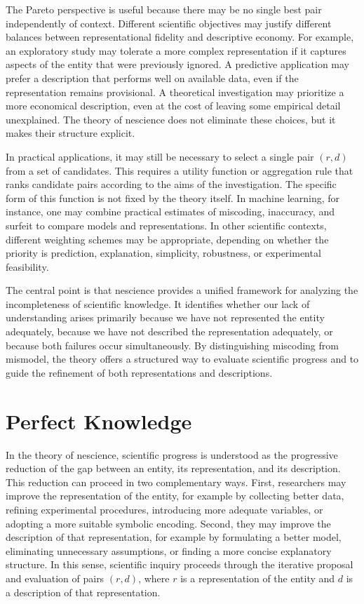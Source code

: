 The Pareto perspective is useful because there may be no single best pair independently of context. Different scientific objectives may justify different balances between representational fidelity and descriptive economy. For example, an exploratory study may tolerate a more complex representation if it captures aspects of the entity that were previously ignored. A predictive application may prefer a description that performs well on available data, even if the representation remains provisional. A theoretical investigation may prioritize a more economical description, even at the cost of leaving some empirical detail unexplained. The theory of nescience does not eliminate these choices, but it makes their structure explicit.

In practical applications, it may still be necessary to select a single pair $(r,d)$ from a set of candidates. This requires a utility function or aggregation rule that ranks candidate pairs according to the aims of the investigation. The specific form of this function is not fixed by the theory itself. In machine learning, for instance, one may combine practical estimates of miscoding, inaccuracy, and surfeit to compare models and representations. In other scientific contexts, different weighting schemes may be appropriate, depending on whether the priority is prediction, explanation, simplicity, robustness, or experimental feasibility.

The central point is that nescience provides a unified framework for analyzing the incompleteness of scientific knowledge. It identifies whether our lack of understanding arises primarily because we have not represented the entity adequately, because we have not described the representation adequately, or because both failures occur simultaneously. By distinguishing miscoding from mismodel, the theory offers a structured way to evaluate scientific progress and to guide the refinement of both representations and descriptions.


%
%

\section{Perfect Knowledge}

In the theory of nescience, scientific progress is understood as the progressive reduction of the gap between an entity, its representation, and its description. This reduction can proceed in two complementary ways. First, researchers may improve the representation of the entity, for example by collecting better data, refining experimental procedures, introducing more adequate variables, or adopting a more suitable symbolic encoding. Second, they may improve the description of that representation, for example by formulating a better model, eliminating unnecessary assumptions, or finding a more concise explanatory structure. In this sense, scientific inquiry proceeds through the iterative proposal and evaluation of pairs $(r,d)$, where $r$ is a representation of the entity and $d$ is a description of that representation.

